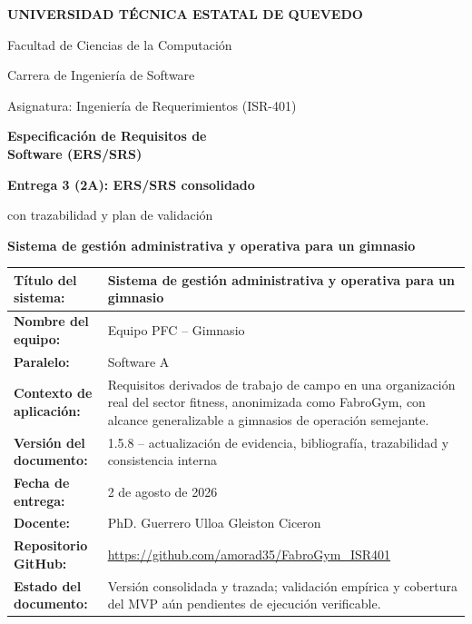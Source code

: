 \documentclass[11pt,a4paper,twoside]{article}
\begin{document}
\begin{titlepage}
\centering
{\Large\bfseries UNIVERSIDAD TÉCNICA ESTATAL DE QUEVEDO\par}
\vspace{0.28cm}
{\large Facultad de Ciencias de la Computación\par}
{\large Carrera de Ingeniería de Software\par}
\vspace{0.50cm}
{\large Asignatura: Ingeniería de Requerimientos (ISR-401)\par}
\vspace{0.50cm}
{\LARGE\bfseries Especificación de Requisitos de\\Software (ERS/SRS)\par}
\vspace{0.30cm}
{\Large\bfseries Entrega 3 (2A): ERS/SRS consolidado\par}
{\normalsize con trazabilidad y plan de validación\par}
\vspace{0.48cm}
{\Large\bfseries Sistema de gestión administrativa y operativa para un gimnasio\par}
\vspace{0.45cm}
\renewcommand{\arraystretch}{1.08}
\small
\begin{tabularx}{\textwidth}{|>{\bfseries}p{3.7cm}|X|}\hline
Título del sistema: & Sistema de gestión administrativa y operativa para un gimnasio\\\hline
Nombre del equipo: & Equipo PFC -- Gimnasio\\\hline
Paralelo: & Software A\\\hline
Contexto de aplicación: & Requisitos derivados de trabajo de campo en una organización real del sector fitness, anonimizada como FabroGym, con alcance generalizable a gimnasios de operación semejante.\\\hline
Versión del documento: & 1.5.8 -- actualización de evidencia, bibliografía, trazabilidad y consistencia interna\\\hline
Fecha de entrega: & 2 de agosto de 2026\\\hline
Docente: & PhD. Guerrero Ulloa Gleiston Ciceron\\\hline
Repositorio GitHub: & \url{https://github.com/amorad35/FabroGym_ISR401}\\\hline
Estado del documento: & Versión consolidada y trazada; validación empírica y cobertura del MVP aún pendientes de ejecución verificable.\\\hline
\end{tabularx}

\end{titlepage}
\end{document}

